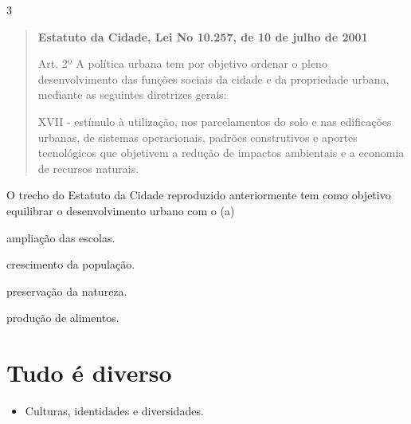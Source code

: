 \num{3}

\begin{quote}
\textbf{Estatuto da Cidade, Lei No 10.257, de 10 de julho de 2001}

Art. 2º A política urbana tem por objetivo
ordenar o pleno desenvolvimento das funções sociais da cidade e da
propriedade urbana, mediante as seguintes diretrizes gerais:

XVII - estímulo à utilização, nos parcelamentos do solo e nas
edificações urbanas, de sistemas operacionais, padrões construtivos e
aportes tecnológicos que objetivem a redução de impactos ambientais e a
economia de recursos naturais.

\end{quote}

O trecho do Estatuto da Cidade reproduzido anteriormente tem como objetivo
equilibrar o desenvolvimento urbano com o (a)

\begin{minipage}{.5\textwidth}
\begin{escolha}
\item ampliação das escolas.

\item crescimento da população.

\item preservação da natureza.

\item produção de alimentos.
\end{escolha}
\end{minipage}

\chapter{Tudo é diverso}



\begin{itemize}
\item Culturas, identidades e diversidades.
\end{itemize}


